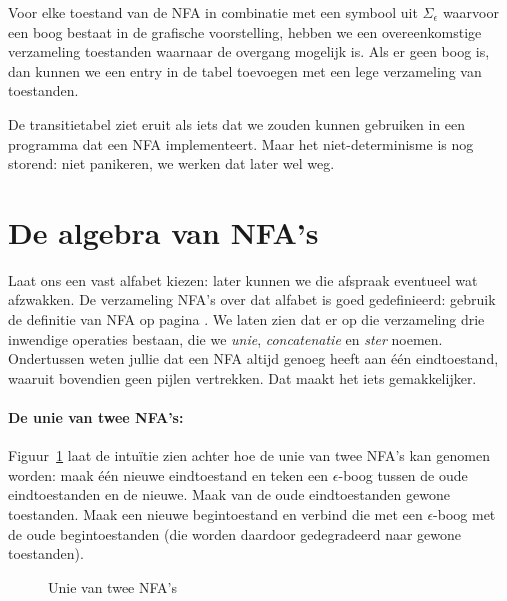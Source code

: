 Voor elke toestand van de NFA in combinatie met een symbool uit
$\Sigma_\epsilon$ waarvoor een boog bestaat in de grafische
voorstelling, hebben we een overeenkomstige verzameling toestanden
waarnaar de overgang mogelijk is. Als er geen boog is, dan kunnen we
een entry in de tabel toevoegen met een lege verzameling van
toestanden.  

De transitietabel ziet eruit als iets dat we zouden kunnen gebruiken
in een programma dat een NFA implementeert. Maar het niet-determinisme
is nog storend: niet panikeren, we werken dat later wel weg.


\section{De algebra van NFA's}

Laat ons een vast alfabet kiezen: later kunnen we die afspraak eventueel
wat afzwakken. De verzameling NFA's over dat alfabet is goed
gedefinieerd: gebruik de definitie van NFA op pagina
\pageref{nfadef}. We laten zien dat er op die verzameling drie
inwendige operaties bestaan, die we {\em unie}, {\em concatenatie} en
{\em ster} noemen. Ondertussen weten jullie dat een NFA altijd genoeg
heeft aan \'{e}\'{e}n eindtoestand, waaruit bovendien geen pijlen
vertrekken. Dat maakt het iets gemakkelijker.

\paragraph{De unie van twee NFA's:} 

Figuur~\ref{uniefsa} laat de intu\"{i}tie zien achter hoe de unie van twee
NFA's kan genomen worden: maak \'{e}\'{e}n nieuwe eindtoestand en teken
een $\epsilon$-boog tussen de oude eindtoestanden en de nieuwe. Maak
van de oude eindtoestanden gewone toestanden. Maak een nieuwe
begintoestand en verbind die met een $\epsilon$-boog met de oude
begintoestanden (die worden daardoor gedegradeerd naar gewone toestanden).


\begin{figure}[h]
\caption{Unie van twee NFA's\label{uniefsa}}
\end{figure}


